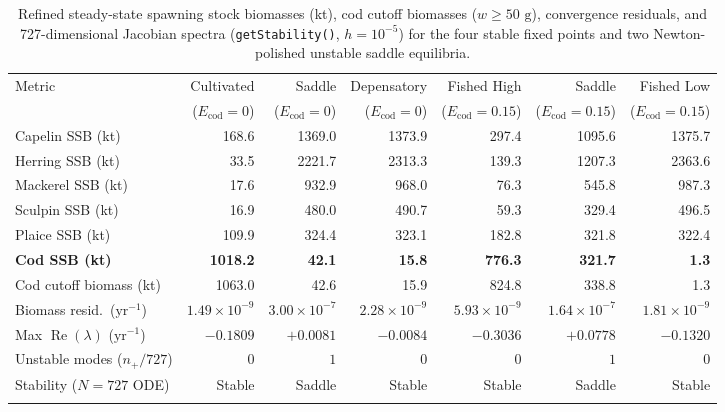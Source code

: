 \documentclass[11pt,letterpaper]{article}
\newcommand{\toprule}{\noalign{\hrule height 0.85pt\vspace{2.5pt}}}
\newcommand{\midrule}{\noalign{\vspace{2pt}\hrule height 0.45pt\vspace{2.5pt}}}
\newcommand{\bottomrule}{\noalign{\vspace{2pt}\hrule height 0.85pt}}
\begin{document}
\begin{table}[t!]
\centering
\caption{Refined steady-state spawning stock biomasses (kt), cod cutoff biomasses ($w \ge 50\text{ g}$), convergence residuals, and 727-dimensional Jacobian spectra (\texttt{getStability()}, $h = 10^{-5}$) for the four stable fixed points and two Newton-polished unstable saddle equilibria.}
\label{tab:equilibria}
\vspace{0.35em}
{\footnotesize
\setlength{\tabcolsep}{3.8pt}
\begin{tabular}{lrrrrrr}
\toprule
Metric & Cultivated & Saddle & Depensatory & Fished High & Saddle & Fished Low \\
       & ($E_{\mathrm{cod}}=0$) & ($E_{\mathrm{cod}}=0$) & ($E_{\mathrm{cod}}=0$) & ($E_{\mathrm{cod}}=0.15$) & ($E_{\mathrm{cod}}=0.15$) & ($E_{\mathrm{cod}}=0.15$) \\
\midrule
Capelin SSB (kt)        &  168.6 & 1369.0 & 1373.9 &  297.4 & 1095.6 & 1375.7 \\
Herring SSB (kt)        &   33.5 & 2221.7 & 2313.3 &  139.3 & 1207.3 & 2363.6 \\
Mackerel SSB (kt)       &   17.6 &  932.9 &  968.0 &   76.3 &  545.8 &  987.3 \\
Sculpin SSB (kt)        &   16.9 &  480.0 &  490.7 &   59.3 &  329.4 &  496.5 \\
Plaice SSB (kt)         &  109.9 &  324.4 &  323.1 &  182.8 &  321.8 &  322.4 \\
\textbf{Cod SSB (kt)}   & \textbf{1018.2} & \textbf{42.1} & \textbf{15.8} & \textbf{776.3} & \textbf{321.7} & \textbf{1.3} \\
Cod cutoff biomass (kt) & 1063.0 &   42.6 &   15.9 &  824.8 &  338.8 &    1.3 \\
\midrule
Biomass resid.\ ($\text{yr}^{-1}$) & $1.49\times 10^{-9}$ & $3.00\times 10^{-7}$ & $2.28\times 10^{-9}$ & $5.93\times 10^{-9}$ & $1.64\times 10^{-7}$ & $1.81\times 10^{-9}$ \\
Max $\operatorname{Re}(\lambda)$ ($\text{yr}^{-1}$) & $-0.1809$ & $+0.0081$ & $-0.0084$ & $-0.3036$ & $+0.0778$ & $-0.1320$ \\
Unstable modes ($n_+ / 727$) & $0$ & $1$ & $0$ & $0$ & $1$ & $0$ \\
Stability ($N=727$ ODE) & Stable & Saddle & Stable & Stable & Saddle & Stable \\
\bottomrule
\end{tabular}
}
\end{table}
\end{document}
